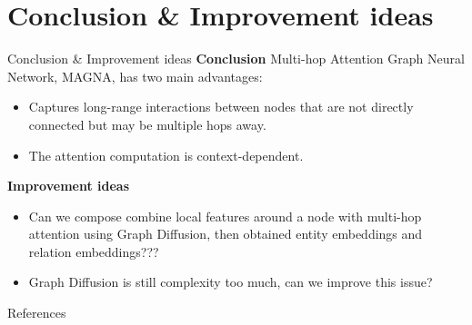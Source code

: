 \documentclass[notheorems, aspectratio=149]{beamer}
\begin{document}
		\section{Conclusion \& Improvement ideas}
		\begin{frame}{Conclusion \& Improvement ideas}
			\textbf{Conclusion} Multi-hop Attention Graph Neural Network, MAGNA, has two main advantages:
			\begin{itemize}
				\item Captures
long-range interactions between nodes that are not directly
connected but may be multiple hops away.
				\item The attention computation is context-dependent.
			\end{itemize}
			\textbf{Improvement ideas}
			\begin{itemize}
				\item Can we compose combine local features around a node with multi-hop attention using Graph Diffusion, then obtained entity embeddings and relation embeddings???
				\item Graph Diffusion is still complexity too much, can we improve this issue?
			\end{itemize}
		\end{frame}
		\begin{frame}{References}
			\nocite{*}
			\newpage\cleardoublepage
			
		\end{frame}	
	
\end{document}
